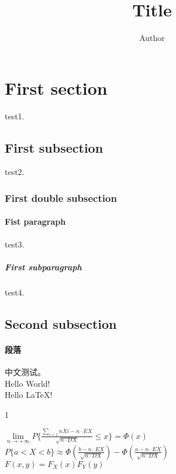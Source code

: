 \documentclass[UTF8]{article}
\title {Title}
\author {Author}
\begin{document}
\maketitle
\section{First section} test1.
    \subsection{First subsection} test2.
        \subsubsection{First double subsection}
            \paragraph{Fist paragraph} test3.
                \subparagraph{First subparagraph} test4.
    \subsection{Second subsection}
        \paragraph{段落} 中文测试。
\\
Hello World! \\ %
Hello \LaTeX ! \\
\begin{description}
  \item[1]
\end{description}
$\lim\limits_{n \rightarrow +\infty} P\lbrace\frac{\sum\limits_{i=1}{n}Xi - n\cdot EX}{ \sqrt{n \cdot DX} }  \leqslant x\rbrace = \Phi(x)$ \\

$P\lbrace a<X<b \rbrace \approx \Phi(\frac{b - n\cdot EX}{\sqrt {n\cdot DX}}) - \Phi(\frac{a - n\cdot EX}{\sqrt{n\cdot DX} })$ \\

$F(x,y) = F_{X}(x)F_{Y}(y)$
\end{document}
